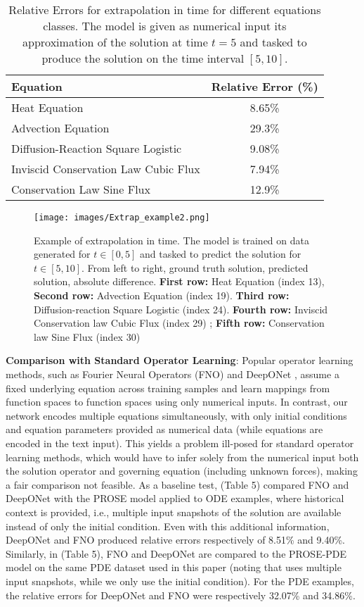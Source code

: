 \documentclass{article}
\begin{document}
\begin{table}[H]
\centering
\begin{tabular}{|l|c|}
\hline
\textbf{Equation} & \textbf{Relative Error (\%)} \\
\hline
Heat Equation & 8.65\% \\
Advection Equation & 29.3\% \\
Diffusion-Reaction Square Logistic & 9.08\% \\
Inviscid Conservation Law Cubic Flux & 7.94\% \\
Conservation Law Sine Flux & 12.9\% \\
\hline
\end{tabular}
\caption{Relative Errors for extrapolation in time for different equations classes. The model is given as numerical input its approximation of the solution at time $t=5$ and tasked to produce the solution on the time interval $[5,10]$.}
\label{tab:extrap}
\end{table}


\begin{figure}[h!]
    \centering
    \texttt{[image: images/Extrap\_example2.png]}
    \caption{Example of extrapolation in time. The model is trained on data generated for $t\in[0,5]$ and tasked to predict the solution for $t\in [5,10]$. From left to right, ground truth solution, predicted solution, absolute difference. \textbf{First row:} Heat Equation (index 13), \textbf{Second row:} Advection Equation (index 19). \textbf{Third row:} Diffusion-reaction Square Logistic (index 24). \textbf{Fourth row:} Inviscid Conservation law Cubic Flux (index 29) ; \textbf{Fifth row:} Conservation law Sine Flux (index 30)}
    \label{fig:Extrap_sol}
\end{figure}

\noindent
\textbf{Comparison with Standard Operator Learning}: 
Popular operator learning methods, such as Fourier Neural Operators (FNO) \cite{li2020fourier} and DeepONet \cite{lu2021learning}, assume a fixed underlying equation across training samples and learn mappings from function spaces to function spaces using only numerical inputs. In contrast, our network encodes multiple equations simultaneously, with only initial conditions and equation parameters provided as numerical data (while equations are encoded in the text input). This yields a problem ill-posed for standard operator learning methods, which would have to infer solely from the numerical input both the solution operator and governing equation (including unknown forces), making a fair comparison not feasible. As a baseline test, \cite{liu2024prose} (Table 5) compared FNO and DeepONet with the PROSE model applied to ODE examples, where historical context is provided, i.e., multiple input snapshots of the solution are available instead of only the initial condition. Even with this additional information, DeepONet and FNO produced relative errors respectively of 8.51\% and 9.40\%. Similarly, in \cite{sun2024towards} (Table 5), FNO and DeepONet are compared to the PROSE-PDE model on the same PDE dataset used in this paper (noting that \cite{sun2024towards} uses multiple input snapshots, while we only use the initial condition). For the PDE examples, the relative errors for DeepONet and FNO were respectively 32.07\% and 34.86\%. 
\end{document}
